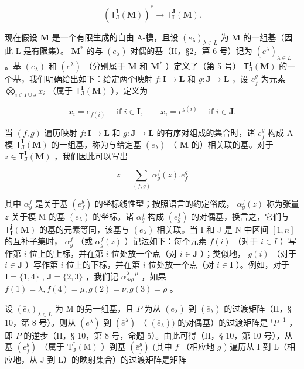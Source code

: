 \[
(\mathsf {T} _ {\mathbf {J}} ^ {\mathbf {I}} (\mathbf {M})) ^ {*} \to \mathsf {T} _ {\mathbf {I}} ^ {\mathbf {J}} (\mathbf {M}).
\]

现在假设 \(\mathbf{M}\) 是一个有限生成的自由 A-模，且设 \((e_{\lambda})_{\lambda \in L}\) 为 \(\mathbf{M}\) 的一组基（因此 L 是有限集）。 \(\mathbf{M}^*\) 的与 \((e_{\lambda})\) 对偶的基（II，§2，第 6 号）记为 \((e^{\lambda})_{\lambda \in L}\) 。基 \((e_{\lambda})\) 和 \((e^{\lambda})\) （分别属于 \(\mathbf{M}\) 和 \(\mathbf{M}^*\) ）定义了（第 5 号） \(\mathsf{T}_{\mathbf{J}}^{\mathbf{I}}(\mathbf{M})\) 的一个基，我们明确给出如下：给定两个映射 \(f\colon \mathbf{I} \to \mathbf{L}\) 和 \(g\colon \mathbf{J} \to \mathbf{L}\) ，设 \(e_f^g\) 为元素 \(\bigotimes_{i \in I \cup J} x_i\) （属于 \(\mathsf{T}_{\mathbf{J}}^{\mathbf{I}}(\mathbf{M})\) ），定义为

\[
x _ {i} = e _ {f (i)} \quad \text { if } i \in \mathbf {I}, \qquad x _ {i} = e ^ {g (i)} \quad \text { if } i \in \mathbf {J}.
\]

当 \((f, g)\) 遍历映射 \(f: \mathbf{I} \to \mathbf{L}\) 和 \(g: \mathbf{J} \to \mathbf{L}\) 的有序对组成的集合时，诸 \(e_f^g\) 构成 A-模 \(\mathsf{T}_{\mathbf{J}}^{\mathbf{I}}(\mathbf{M})\) 的一组基，称为与给定基 \((e_{\lambda})\) （ \(\mathbf{M}\) 的）相关联的基。对于 \(z \in \mathsf{T}_{\mathbf{J}}^{\mathbf{I}}(\mathbf{M})\) ，我们因此可以写出

\[
z = \sum_ {(f, g)} \alpha_ {g} ^ {f} (z). e _ {f} ^ {g}\tag{12}
\]

其中 \(\alpha_g^f\) 是关于基 \((e_f^g)\) 的坐标线性型；按照语言的约定俗成， \(\alpha_g^f(z)\) 称为张量 \(z\) 关于模 M 的基 \((e_\lambda)\) 的坐标。诸 \(\alpha_g^f\) 构成 \((e_g^f)\) 的对偶基，换言之，它们与 \(\mathsf{T}_{\mathbf{I}}^{\mathbf{j}}(\mathbf{M})\) 的基的元素等同，该基与 \((e_\lambda)\) 相关联。当 I 和 J 是 N 中区间 \([1,n]\) 的互补子集时， \(\alpha_g^f\) （或 \(\alpha_g^f(z)\) ）记法如下：每个元素 \(f(i)\) （对于 \(i\in I\) ）写作第 \(i\) 位上的上标，并在第 \(i\) 位处放一个点（对 \(i \in \mathbf{J}\) ）；类似地， \(g(i)\) （对于 \(i \in \mathbf{J}\) ）写作第 \(i\) 位上的下标，并在第 \(i\) 位处放一个点（对 \(i \in \mathbf{I}\) ）。例如，对于 \(\mathbf{I} = \{1, 4\}\) , \(\mathbf{J} = \{2, 3\}\) ，我们记 \(\alpha_{\cdot \nu \rho}^{\lambda \cdot \cdot \mu}\) ，如果 \(f(1) = \lambda, f(4) = \mu, g(2) = \nu, g(3) = \rho\) 。

设 \((\bar{e}_{\lambda})_{\lambda \in L}\) 为 M 的另一组基，且 \(P\) 为从 \((e_{\lambda})\) 到 \((\bar{e}_{\lambda})\) 的过渡矩阵（II，§ 10，第 8 号）。则从 \((e^{\lambda})\) 到 \((\bar{e}^{\lambda})\) （ \((\bar{e}_{\lambda}))\) 的对偶基）的过渡矩阵是 \(^{t}P^{-1}\) ，即 \(P\) 的逆步（II，§ 10，第 8 号，命题 5）。由此可得（II，§ 10，第 10 号），从基 \((e_{f}^{g})\) （属于 \(\mathrm{T}_{\mathrm{J}}^{\mathrm{I}}(\mathrm{M})\) ）到基 \((\bar{e}_{f}^{g})\) (其中 \(f\) （相应地 \(g\) ) 遍历从 I 到 L（相应地，从 J 到 L）的映射集合）的过渡矩阵是矩阵

